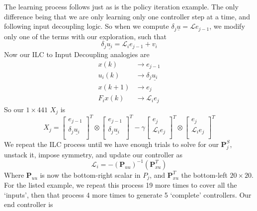 The learning process follows just as is the policy iteration example. The only difference being that we are only learning only one controller step at a time, and following input decoupling logic. So when we compute $\delta_j\underline{u}=\mathcal{L}e_{j-1}$, we modify only one of the terms with our exploration, such that
\begin{equation}
    \delta_j\underline{u_i}=\mathcal{L}_i e_{j-1}+v_i
\end{equation}
Now our ILC to Input Decoupling analogies are
\begin{align}
    x\left(k\right)&\rightarrow e_{j-1} \\
    u_i\left(k\right)&\rightarrow\delta_j\underline{u_i} \\
    x\left(k+1\right)&\rightarrow e_j \\
    F_i x\left(k\right)&\rightarrow\mathcal{L}_i e_j
\end{align}
So our $1 \times441$ $X_j$ is 
\begin{equation}
    X_j={\left[\begin{matrix}e_{j-1}\\\delta_j\underline{u_i}\\\end{matrix}\right]}^T\otimes{\left[\begin{matrix}e_{j-1}\\\delta_j\underline{u_i}\\\end{matrix}\right]}^T-{\gamma\left[\begin{matrix}e_j\\\mathcal{L}_i e_j\\\end{matrix}\right]}^T\otimes{\left[\begin{matrix}e_j\\\mathcal{L}_i e_j\\\end{matrix}\right]}^T
\end{equation}
We repeat the ILC process until we have enough trials to solve for our $\textbf{P}_j^S$, unstack it, impose symmetry, and update our controller as
\begin{equation}
    \mathcal{L}_i=-{\left(\textbf{P}_{uu}\right)}^{-1}\left(\textbf{P}_{xu}^T\right)
\end{equation}
Where $\textbf{P}_{uu}$ is now the bottom-right scalar in $P_j$, and $\textbf{P}_{xu}^T$ the bottom-left $20\times20$. For the listed example, we repeat this process 19 more times to cover all the `inputs', then that process 4 more times to generate 5 `complete' controllers. Our end controller is

